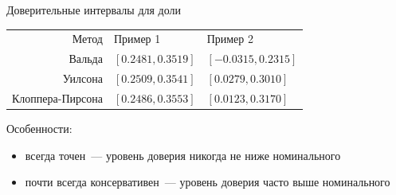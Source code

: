 \documentclass[9pt,pdf,utf8,hyperref={unicode},aspectratio=169]{beamer}
\begin{document}
\begin{frame}{Доверительные интервалы для доли}
{    \bigskip

    \begin{center}
    	\begin{tabular}{rll}
    		Метод                   & Пример 1 & Пример 2 \\
    		Вальда                  & $[0.2481, 0.3519]$ & $[-0.0315, 0.2315]$\\
    		Уилсона                 & $[0.2509, 0.3541]$ & $[0.0279, 0.3010]$ \\
    		Клоппера-Пирсона        & $[0.2486, 0.3553]$ & $[0.0123, 0.3170]$\\      
    	\end{tabular}
    \end{center}     
    
 
 \bigskip
 
 Особенности:
 \begin{itemize}
 	\item всегда точен~--- уровень доверия никогда не ниже номинального
 	\item почти всегда консервативен~--- уровень доверия часто выше номинального
 \end{itemize}    
}
    
\end{frame}
\end{document}
